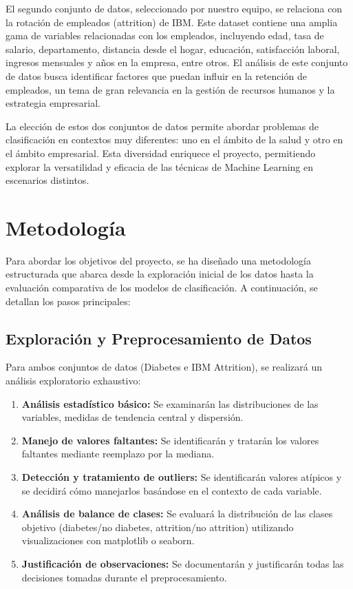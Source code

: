 \documentclass[conference]{IEEEtran}
\begin{document}
El segundo conjunto de datos, seleccionado por nuestro equipo, se relaciona con la rotación de empleados (attrition) de IBM. Este dataset contiene una amplia gama de variables relacionadas con los empleados, incluyendo edad, tasa de salario, departamento, distancia desde el hogar, educación, satisfacción laboral, ingresos mensuales y años en la empresa, entre otros. El análisis de este conjunto de datos busca identificar factores que puedan influir en la retención de empleados, un tema de gran relevancia en la gestión de recursos humanos y la estrategia empresarial.

La elección de estos dos conjuntos de datos permite abordar problemas de clasificación en contextos muy diferentes: uno en el ámbito de la salud y otro en el ámbito empresarial. Esta diversidad enriquece el proyecto, permitiendo explorar la versatilidad y eficacia de las técnicas de Machine Learning en escenarios distintos.

\section{Metodología}

Para abordar los objetivos del proyecto, se ha diseñado una metodología estructurada que abarca desde la exploración inicial de los datos hasta la evaluación comparativa de los modelos de clasificación. A continuación, se detallan los pasos principales:

\subsection{Exploración y Preprocesamiento de Datos}

Para ambos conjuntos de datos (Diabetes e IBM Attrition), se realizará un análisis exploratorio exhaustivo:

\begin{enumerate}
    \item \textbf{Análisis estadístico básico:} Se examinarán las distribuciones de las variables, medidas de tendencia central y dispersión.
    \item \textbf{Manejo de valores faltantes:} Se identificarán y tratarán los valores faltantes mediante reemplazo por la mediana.
    \item \textbf{Detección y tratamiento de outliers:} Se identificarán valores atípicos y se decidirá cómo manejarlos basándose en el contexto de cada variable.
    \item \textbf{Análisis de balance de clases:} Se evaluará la distribución de las clases objetivo (diabetes/no diabetes, attrition/no attrition) utilizando visualizaciones con matplotlib o seaborn.
    \item \textbf{Justificación de observaciones:} Se documentarán y justificarán todas las decisiones tomadas durante el preprocesamiento.
\end{enumerate}
\end{document}
